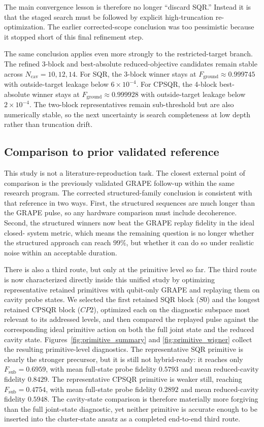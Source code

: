 ﻿\documentclass[aps,pra,twocolumn,reprint,amsmath,amssymb,floatfix]{revtex4-2}
\begin{document}
The main convergence lesson is therefore no longer ``discard SQR.'' Instead it
is that the staged search must be followed by explicit high-truncation
re-optimization. The earlier corrected-scope conclusion was too pessimistic
because it stopped short of this final refinement step.

The same conclusion applies even more strongly to the restricted-target branch.
The refined 3-block and best-absolute reduced-objective candidates remain
stable across \(N_{\mathrm{cav}}=10,12,14\). For SQR, the 3-block winner stays
at $F_{\mathrm{ground}}\approx0.999745$ with outside-target leakage below
$6\times10^{-4}$. For CPSQR, the 4-block best-absolute winner stays at
$F_{\mathrm{ground}}\approx0.999928$ with outside-target leakage below
$2\times10^{-4}$. The two-block representatives remain sub-threshold but are
also numerically stable, so the next uncertainty is search completeness at low
depth rather than truncation drift.

\subsection{Comparison to prior validated reference}

This study is not a literature-reproduction task. The closest external point of
comparison is the previously validated GRAPE follow-up within the same research
program. The corrected structured-family conclusion is consistent with that
reference in two ways. First, the structured sequences are much longer than the
GRAPE pulse, so any hardware comparison must include decoherence. Second, the
structured winners now beat the GRAPE replay fidelity in the ideal closed-
system metric, which means the remaining question is no longer whether the
structured approach can reach $99\%$, but whether it can do so under realistic
noise within an acceptable duration.

There is also a third route, but only at the primitive level so far. The
third route is now characterized directly inside this unified study by
optimizing representative retained primitives with qubit-only GRAPE and
replaying them on cavity probe states. We selected the first retained SQR block
($S0$) and the longest retained CPSQR block ($CP2$), optimized each on the
diagnostic subspace most relevant to its addressed levels, and then compared
the replayed pulse against the corresponding ideal primitive action on both the
full joint state and the reduced cavity state. Figures~\ref{fig:primitive_summary}
and \ref{fig:primitive_wigner} collect the resulting primitive-level
diagnostics. The representative SQR primitive is clearly the stronger
precursor, but it is still not hybrid-ready: it reaches only
$F_{\mathrm{sub}}=0.6959$, with mean full-state probe fidelity $0.5793$ and
mean reduced-cavity fidelity $0.8429$. The representative CPSQR primitive is
weaker still, reaching $F_{\mathrm{sub}}=0.4754$, with mean full-state probe
fidelity $0.2892$ and mean reduced-cavity fidelity $0.5948$. The cavity-state
comparison is therefore materially more forgiving than the full joint-state
diagnostic, yet neither primitive is accurate enough to be inserted into the
cluster-state ansatz as a completed end-to-end third route.
\end{document}
